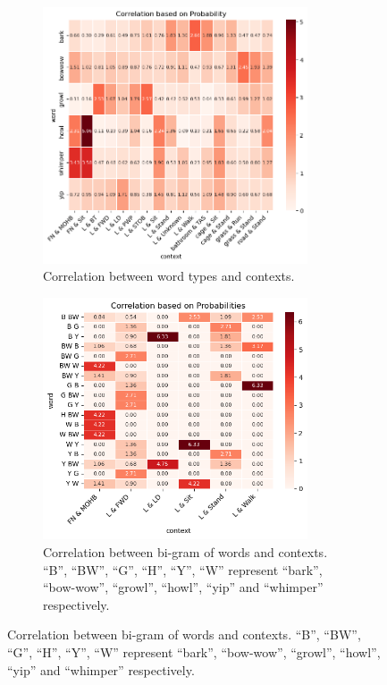 \begin{figure}[h]
\begin{subfigure}[]{0.4\textwidth}
	\centering
	\includegraphics[width=0.86\textwidth]{images/one_sound_context.png}
	\caption{Correlation between word types and contexts.}
\label{fig:one_sound_context}
\end{subfigure}
\begin{subfigure}[]{0.4\textwidth}
	\centering
	\includegraphics[width=0.86\textwidth]{images/sound_sequence_context.png}
	\caption{Correlation between bi-gram of words and contexts. 
``B'', ``BW'', ``G'', ``H'', ``Y'', ``W'' represent ``bark'', ``bow-wow'', ``growl'', ``howl'', ``yip'' and ``whimper'' respectively.}

\end{subfigure}
\end{figure}
